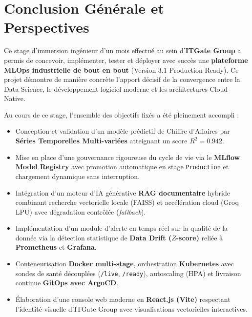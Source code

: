 \documentclass[11pt,a4paper,oneside]{report}
\begin{document}
\newpage

\chapter*{Conclusion Générale et Perspectives}

Ce stage d'immersion ingénieur d'un mois effectué au sein d'\textbf{ITGate Group} a permis de concevoir, implémenter, tester et déployer avec succès une \textbf{plateforme MLOps industrielle de bout en bout} (Version 3.1 Production-Ready). Ce projet démontre de manière concrète l'apport décisif de la convergence entre la Data Science, le développement logiciel moderne et les architectures Cloud-Native.

\begin{focusbox}
Au cours de ce stage, l'ensemble des objectifs fixés a été pleinement accompli :
\begin{itemize}[leftmargin=0.5cm, itemsep=0.5pt, topsep=1pt]
    \item Conception et validation d'un modèle prédictif de Chiffre d'Affaires par \textbf{Séries Temporelles Multi-variées} atteignant un score $R^2 = 0.942$.
    \item Mise en place d'une gouvernance rigoureuse du cycle de vie via le \textbf{MLflow Model Registry} avec promotion automatique en stage \texttt{Production} et chargement dynamique sans interruption.
    \item Intégration d'un moteur d'IA générative \textbf{RAG documentaire} hybride combinant recherche vectorielle locale (FAISS) et accélération cloud (Groq LPU) avec dégradation contrôlée (\textit{fallback}).
    \item Implémentation d'un module d'alerte en temps réel sur la qualité de la donnée via la détection statistique de \textbf{Data Drift ($Z$-score)} reliée à \textbf{Prometheus} et \textbf{Grafana}.
    \item Conteneurisation \textbf{Docker multi-stage}, orchestration \textbf{Kubernetes} avec sondes de santé découplées (\texttt{/live}, \texttt{/ready}), autoscaling (HPA) et livraison continue \textbf{GitOps avec ArgoCD}.
    \item Élaboration d'une console web moderne en \textbf{React.js (Vite)} respectant l'identité visuelle d'ITGate Group avec visualisations vectorielles interactives.
\end{itemize}
\end{focusbox}
\end{document}
